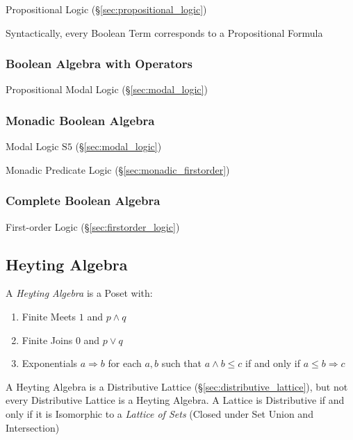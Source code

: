 Propositional Logic (\S\ref{sec:propositional_logic})

Syntactically, every Boolean Term corresponds to a Propositional
Formula



\subsubsection{Boolean Algebra with Operators}\label{sec:boolean_with_operators}

Propositional Modal Logic (\S\ref{sec:modal_logic})



\subsubsection{Monadic Boolean Algebra}\label{sec:monadic_boolean}

Modal Logic $\mathrm{S5}$ (\S\ref{sec:modal_logic})

Monadic Predicate Logic (\S\ref{sec:monadic_firstorder})



\subsubsection{Complete Boolean Algebra}\label{sec:complete_boolean}

First-order Logic (\S\ref{sec:firstorder_logic})



\subsection{Heyting Algebra}\label{sec:heyting_algebra}

A \emph{Heyting Algebra} is a Poset with:
\begin{enumerate}
  \item Finite Meets $1$ and $p \wedge q$
  \item Finite Joins $0$ and $p \vee q$
  \item Exponentials $a \Rightarrow b$ for each $a,b$ such that $a
    \wedge b \leq c$ if and only if $a \leq b \Rightarrow c$
\end{enumerate}
A Heyting Algebra is a Distributive Lattice
(\S\ref{sec:distributive_lattice}), but not every Distributive Lattice
is a Heyting Algebra. A Lattice is Distributive if and only if it is Isomorphic
to a \emph{Lattice of Sets} (Closed under Set Union and Intersection)

